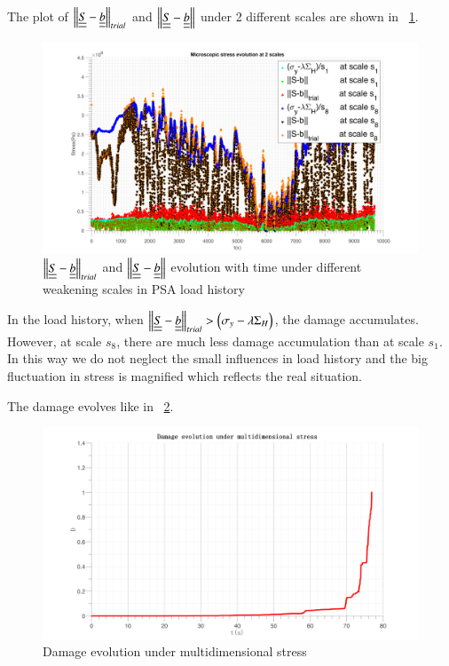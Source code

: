 \documentclass[3p,times,number,review]{elsarticle}
\newcommand{\figref}[1]{\figurename~\ref{#1}}
\begin{document}
 The plot of $\left\|  \uline{\uline{S}}-\uline{\uline{b}}\right\|_{trial}$ and $\left\|  \uline{\uline{S}}-\uline{\uline{b}}\right\|$ under 2 different scales are shown in \figref{trialreal3d}.
\begin{figure}[!h]
	\centering
	\includegraphics[width=\textwidth]{figures//trialreal3d.png} 
	\caption{$\left\|  \uline{\uline{S}}-\uline{\uline{b}}\right\|_{trial}$ and $\left\|  \uline{\uline{S}}-\uline{\uline{b}}\right\|$ evolution with time under different weakening scales in PSA load history}
	\label{trialreal3d}
\end{figure} 



In the load history, when $\left\|  \uline{\uline{S}}-\uline{\uline{b}}\right\|_{trial}>\left(\sigma_y-\lambda \Sigma_H\right)$, the damage accumulates. However, at scale $s_{8}$, there are much less damage accumulation than at scale $s_1$.  In this way we do not neglect the small influences in load history and the big fluctuation in stress is magnified which reflects the real situation. 


The damage evolves like in \figref{dam3d}. 


\begin{figure}[!h]
	\centering
	\includegraphics[width=\textwidth]{figures//damage3d.png} 
	\caption{Damage evolution under multidimensional stress}
	\label{dam3d}
\end{figure}
\fi
\end{document}
